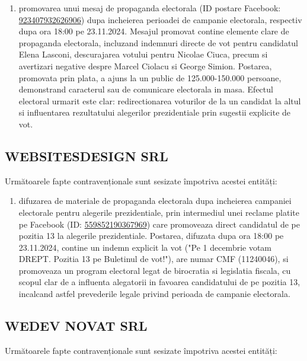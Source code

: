 \documentclass[a4paper,12pt]{article}
\begin{document}
\begin{enumerate}[leftmargin=*, label=\arabic*.)]
    \item promovarea unui mesaj de propaganda electorala (ID postare Facebook: \href{https://www.facebook.com/ads/library/?id=923407932626906}{923407932626906}) dupa incheierea perioadei de campanie electorala, respectiv dupa ora 18:00 pe 23.11.2024. Mesajul promovat contine elemente clare de propaganda electorala, incluzand indemnuri directe de vot pentru candidatul Elena Lasconi, descurajarea votului pentru Nicolae Ciuca, precum si avertizari negative despre Marcel Ciolacu si George Simion. Postarea, promovata prin plata, a ajuns la un public de 125.000-150.000 persoane, demonstrand caracterul sau de comunicare electorala in masa. Efectul electoral urmarit este clar: redirectionarea voturilor de la un candidat la altul si influentarea rezultatului alegerilor prezidentiale prin sugestii explicite de vot.
\end{enumerate}

\vspace{0.5cm}

\subsection{WEBSITESDESIGN SRL}
Următoarele fapte contravenționale sunt sesizate împotriva acestei entități:

\begin{enumerate}[leftmargin=*, label=\arabic*.)]
    \item difuzarea de materiale de propaganda electorala dupa incheierea campaniei electorale pentru alegerile prezidentiale, prin intermediul unei reclame platite pe Facebook (ID: \href{https://www.facebook.com/ads/library/?id=559852190367969}{559852190367969}) care promoveaza direct candidatul de pe pozitia 13 la alegerile prezidentiale. Postarea, difuzata dupa ora 18:00 pe 23.11.2024, contine un indemn explicit la vot ("Pe 1 decembrie votam DREPT. Pozitia 13 pe Buletinul de vot!"), are numar CMF (11240046), si promoveaza un program electoral legat de birocratia si legislatia fiscala, cu scopul clar de a influenta alegatorii in favoarea candidatului de pe pozitia 13, incalcand astfel prevederile legale privind perioada de campanie electorala.
\end{enumerate}

\vspace{0.5cm}

\subsection{WEDEV NOVAT SRL}
Următoarele fapte contravenționale sunt sesizate împotriva acestei entități:
\end{document}
